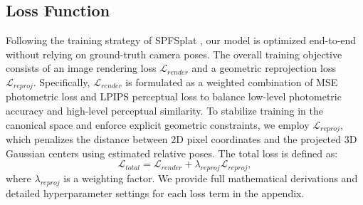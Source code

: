 \documentclass[runningheads]{llncs}
\begin{document}
\subsection{Loss Function}
\label{sec:loss}
Following the training strategy of SPFSplat \cite{huang2025spfsplat}, our model is optimized end-to-end without relying on ground-truth camera poses. The overall training objective consists of an image rendering loss $\mathcal{L}_{render}$ and a geometric reprojection loss $\mathcal{L}_{reproj}$. Specifically, $\mathcal{L}_{render}$ is formulated as a weighted combination of MSE photometric loss and LPIPS \cite{zhang2018lpips} perceptual loss to balance low-level photometric accuracy and high-level perceptual similarity. To stabilize training in the canonical space and enforce explicit geometric constraints, we employ $\mathcal{L}_{reproj}$, which penalizes the distance between 2D pixel coordinates and the projected 3D Gaussian centers using estimated relative poses. The total loss is defined as:
\begin{equation}
    \mathcal{L}_{total} = \mathcal{L}_{render} + \lambda_{reproj}\mathcal{L}_{reproj},
    \label{eq:totalloss}
\end{equation}
where $\lambda_{reproj}$ is a weighting factor.
We provide full mathematical derivations and detailed hyperparameter settings for each loss term in the appendix.


\end{document}
